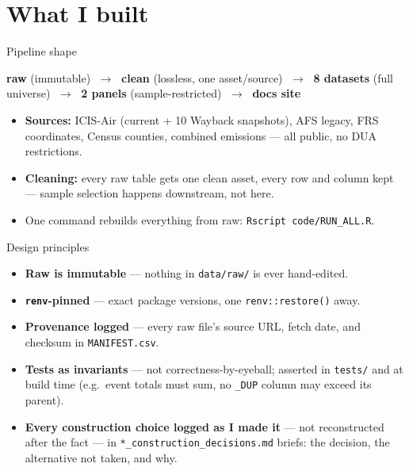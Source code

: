 \documentclass[aspectratio=169,11pt]{beamer}
\begin{document}
\section{What I built}
\begin{frame}{Pipeline shape}
  \begin{center}
  \textbf{raw} (immutable) $\;\rightarrow\;$ \textbf{clean} (lossless, one asset/source) $\;\rightarrow\;$
  \textbf{8 datasets} (full universe) $\;\rightarrow\;$ \textbf{2 panels} (sample-restricted) $\;\rightarrow\;$
  \textbf{docs site}
  \end{center}
  \vspace{0.5em}
  \begin{itemize}
    \item \textbf{Sources:} ICIS-Air (current + 10 Wayback snapshots), AFS legacy, FRS coordinates, Census
      counties, combined emissions — all public, no DUA restrictions.
    \item \textbf{Cleaning:} every raw table gets one clean asset, every row and column kept — sample
      selection happens downstream, not here.
    \item One command rebuilds everything from raw: \texttt{Rscript code/RUN\_ALL.R}.
  \end{itemize}
\end{frame}

\begin{frame}{Design principles}
  \begin{itemize}
    \item \textbf{Raw is immutable} — nothing in \texttt{data/raw/} is ever hand-edited.
    \item \textbf{\texttt{renv}-pinned} — exact package versions, one \texttt{renv::restore()} away.
    \item \textbf{Provenance logged} — every raw file's source URL, fetch date, and checksum in
      \texttt{MANIFEST.csv}.
    \item \textbf{Tests as invariants} — not correctness-by-eyeball; asserted in \texttt{tests/} and at
      build time (e.g.\ event totals must sum, no \texttt{\_DUP} column may exceed its parent).
    \item \textbf{Every construction choice logged as I made it} — not reconstructed after the fact — in
      \texttt{*\_construction\_decisions.md} briefs: the decision, the alternative not taken, and why.
  \end{itemize}
\end{frame}
\end{document}
